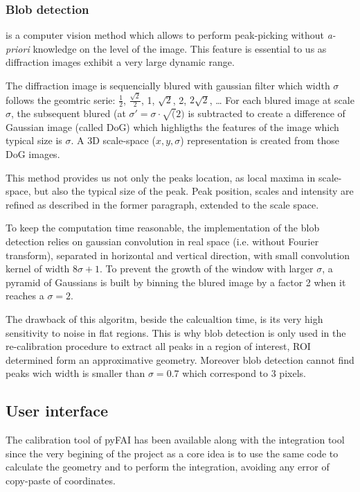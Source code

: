 \documentclass[preprint]{iucr}
\begin{document}
\subsubsection{Blob detection}
\label{blob}
is a computer vision method which allows to perform peak-picking without
\textit{a-priori} knowledge on the level of the image.
This feature is essential to us as diffraction images exhibit a very large
dynamic range.

The diffraction image is sequencially blured with gaussian filter which
width $\sigma$ follows the geomtric serie: $\frac{1}{2}$,
$\frac{\sqrt{2}}{2}$, 1, $\sqrt{2}$, 2, $2\sqrt{2}$, \ldots
For each blured image at scale $\sigma$, the subsequent blured (at
$\sigma'=\sigma\cdot\sqrt(2)$
is subtracted to create a difference of Gaussian
image (called DoG) which highligths the features of the image which typical size
is $\sigma$. 
A 3D scale-space ($x,y,\sigma$) representation is created from those DoG images.

This method provides us not only the peaks location, as local maxima in
scale-space, but also the typical size of the peak. 
Peak position, scales and intensity are refined as described in the former
paragraph, extended to the scale space.

To keep the computation time reasonable, the implementation of the blob
detection relies on gaussian convolution in real space (i.e. without Fourier
transform), separated in horizontal and vertical direction, with small
convolution kernel of width $8 \sigma +1$.
To prevent the growth of the window with larger $\sigma$, a pyramid of Gaussians
is built by binning the blured image by a factor 2 when it reaches a $\sigma=2$.

The drawback of this algoritm, beside the calcualtion time, is its very high
sensitivity to noise in flat regions. 
This is why blob detection is only used in the re-calibration procedure to
extract all peaks in a region of interest, ROI determined form an
approximative geometry.
Moreover blob detection cannot find peaks wich width is smaller than  
$\sigma=0.7$ which correspond to 3 pixels.

\subsection{User interface}
The calibration tool of pyFAI has been available along with the
integration tool since the very begining of the project as a core idea is to
use the same code to calculate the geometry and to perform the integration,
avoiding any error of copy-paste of coordinates.
\end{document}
